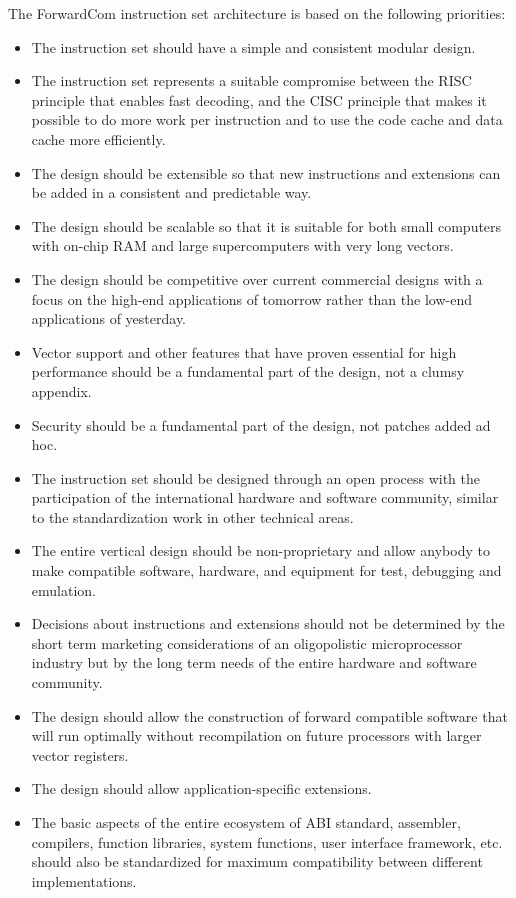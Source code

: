 \documentclass[forwardcom.tex]{subfiles}
\begin{document}
The ForwardCom instruction set architecture is based on the following priorities:
\begin{itemize}
\item The instruction set should have a simple and consistent modular design.
\item The instruction set represents a suitable compromise between the RISC principle that enables fast decoding, and the CISC principle that makes it possible to do more work per instruction and to use the code cache and data cache more efficiently.
\item The design should be extensible so that new instructions and extensions can be added in a consistent and predictable way.
\item The design should be scalable so that it is suitable for both small computers with on-chip RAM and large supercomputers with very long vectors.
\item The design should be competitive over current commercial designs with a focus on the high-end applications of tomorrow rather than the low-end applications of yesterday.
\item Vector support and other features that have proven essential for high performance should be a fundamental part of the design, not a clumsy appendix.
\item Security should be a fundamental part of the design, not patches added ad hoc.
\item The instruction set should be designed through an open process with the participation of the international hardware and software community, similar to the standardization work in other technical areas.
\item The entire vertical design should be non-proprietary and allow anybody to make compatible software, hardware, and equipment for test, debugging and emulation.
\item Decisions about instructions and extensions should not be determined by the short term marketing considerations of an oligopolistic microprocessor industry but by the long term needs of the entire hardware and software community.
\item The design should allow the construction of forward compatible software that will run optimally without recompilation on future processors with larger vector registers.
\item The design should allow application-specific extensions.
\item The basic aspects of the entire ecosystem of ABI standard, assembler, compilers, function libraries, system functions, user interface framework, etc. should also be standardized for maximum compatibility between different implementations.
\end{itemize}
\end{document}
